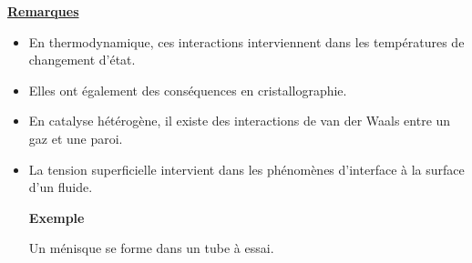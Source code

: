 \documentclass[11pt,a4paper]{article}
\newif\ifinexample
\newcommand{\titr}[1]{\par\ifinexample\else\Needspace{4\baselineskip}\fi\textbf{\underline{#1}}\par\nopagebreak[3]}
\begin{document}
\titr{Remarques}
\begin{itemize}
\item En thermodynamique, ces interactions interviennent dans les températures de changement d'état.
\item Elles ont également des conséquences en cristallographie.
\item En catalyse hétérogène, il existe des interactions de van der Waals entre un gaz et une paroi.
\item La tension superficielle intervient dans les phénomènes d'interface à la surface d'un fluide.
\begin{exemple}\textbf{Exemple}\par Un ménisque se forme dans un tube à essai.\end{exemple}
\end{itemize}
\end{document}
